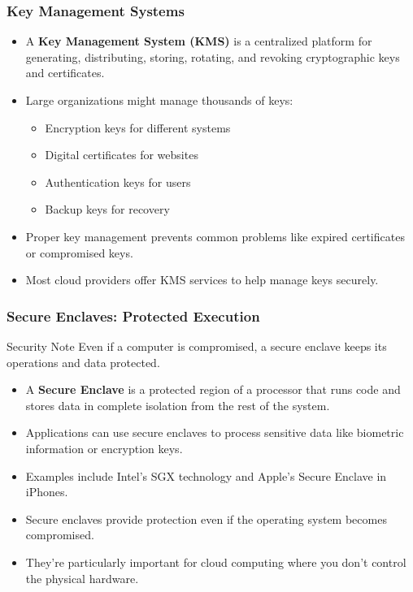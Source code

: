 \documentclass{beamer}
\begin{document}
\begin{frame}
    \frametitle{Key Management Systems}
    
    \begin{itemize}
        \item A \textbf{Key Management System (KMS)} is a centralized platform for generating, distributing, storing, rotating, and revoking cryptographic keys and certificates.
        
        \item Large organizations might manage thousands of keys:
            \begin{itemize}
                \item Encryption keys for different systems
                \item Digital certificates for websites
                \item Authentication keys for users
                \item Backup keys for recovery
            \end{itemize}
        
        \item Proper key management prevents common problems like expired certificates or compromised keys.
        
        \item Most cloud providers offer KMS services to help manage keys securely.
    \end{itemize}
\end{frame}

\begin{frame}
    \frametitle{Secure Enclaves: Protected Execution}
    
    \begin{alertblock}{Security Note}
        Even if a computer is compromised, a secure enclave keeps its operations and data protected.
    \end{alertblock}
    
    \begin{itemize}
        \item A \textbf{Secure Enclave} is a protected region of a processor that runs code and stores data in complete isolation from the rest of the system.
        
        \item Applications can use secure enclaves to process sensitive data like biometric information or encryption keys.
        
        \item Examples include Intel's SGX technology and Apple's Secure Enclave in iPhones.
        
        \item Secure enclaves provide protection even if the operating system becomes compromised.
        
        \item They're particularly important for cloud computing where you don't control the physical hardware.
    \end{itemize}
\end{frame}
\end{document}
